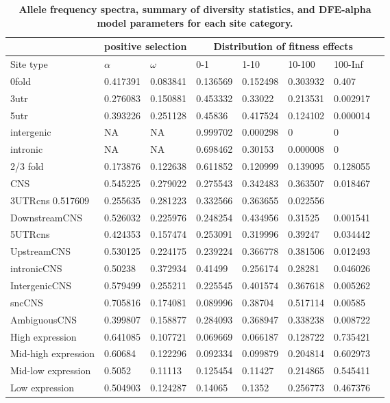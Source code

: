 \documentclass{ut-thesis}
\begin{document}
\begin{table}[h]
\centering
\begin{tabular}{|l |l l l l l l l|} 
\hline
 &\multicolumn{2}{|c|}{positive selection} & \multicolumn{4}{|c|}{Distribution of fitness effects} \\ [0.5ex]
\hline
Site type & $\alpha$& 	$\omega$& 		0-1& 	1-10& 	10-100& 	100-Inf \\ [0.5ex]
 \hline
0fold& 	0.417391& 	0.083841& 	0.136569& 	0.152498& 	0.303932& 	0.407\\
3utr& 	0.276083& 	0.150881& 		0.453332& 	0.33022& 	0.213531& 	0.002917\\
5utr& 	0.393226& 	0.251128& 		0.45836& 	0.417524& 	0.124102& 	0.000014\\
intergenic& 	NA& 	NA& 		0.999702& 	0.000298& 	0& 	0\\
intronic& 	NA& 	NA& 		0.698462& 	0.30153& 	0.000008& 	0\\
2/3 fold& 	0.173876& 	0.122638& 		0.611852& 	0.120999& 	0.139095& 	0.128055\\
CNS& 	0.545225& 	0.279022& 		0.275543& 	0.342483& 	0.363507& 	0.018467\\
\hline							
3UTRcns	0.517609& 	0.255635& 		0.281223& 	0.332566& 	0.363655& 	0.022556\\
DownstreamCNS& 	0.526032& 	0.225976& 		0.248254& 	0.434956& 	0.31525& 	0.001541\\
5UTRcns& 	0.424353& 	0.157474& 		0.253091& 	0.319996& 	0.39247& 	0.034442\\
UpstreamCNS& 	0.530125& 	0.224175& 		0.239224& 	0.366778& 	0.381506& 	0.012493\\
intronicCNS& 	0.50238& 	0.372934& 		0.41499& 	0.256174& 	0.28281& 	0.046026\\
IntergenicCNS& 	0.579499& 	0.255211& 		0.225545& 	0.401574& 	0.367618& 	0.005262\\
sncCNS& 	0.705816& 	0.174081& 		0.089996& 	0.38704& 	0.517114& 	0.00585\\
AmbiguousCNS& 	0.399807& 	0.158877& 		0.284093& 	0.368947& 	0.338238& 	0.008722\\
\hline							
High expression& 	0.641085& 	0.107721& 		0.069669& 	0.066187& 	0.128722& 	0.735421\\
Mid-high expression& 	0.60684& 	0.122296& 		0.092334& 	0.099879& 	0.204814& 	0.602973\\
Mid-low expression& 	0.5052& 	0.11113& 		0.125454& 	0.11427& 	0.214865& 	0.545411\\
Low expression& 	0.504903& 	0.124287& 		0.14065& 	0.1352& 	0.256773& 	0.467376\\ [0.5ex] 
 \hline
\end{tabular}
\caption{\textbf{Allele frequency spectra, summary of diversity statistics, and DFE-alpha model parameters for each site category.}}
\label{table:s2}
\end{table}
\end{document}
